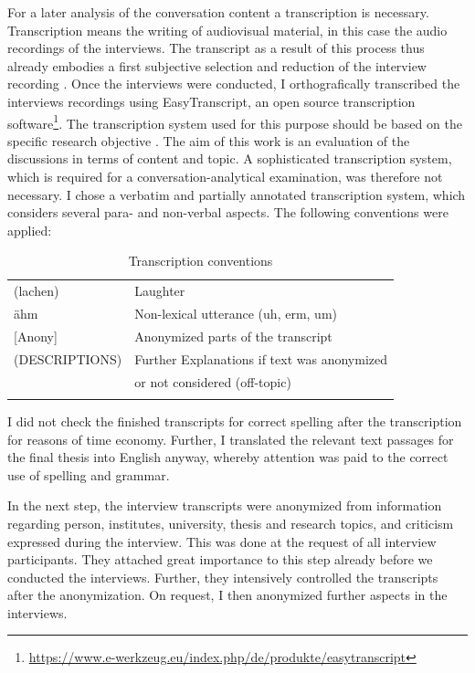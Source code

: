 \documentclass[12pt, a4paper, titlepage, oneside, abstract=true, toc=listof, toc=bibliography, BCOR=1cm]{scrreprt}
\begin{document}
For a later analysis of the conversation content a transcription is necessary. Transcription means the writing of audiovisual material, in this case the audio recordings of the interviews. The transcript as a result of this process thus already embodies a first subjective selection and reduction of the interview recording \citep[p. 321]{Edwards2003}. Once the interviews were conducted, I orthografically transcribed the interviews recordings using EasyTranscript, an open source transcription software\footnote{\url{https://www.e-werkzeug.eu/index.php/de/produkte/easytranscript}}. The transcription system used for this purpose should be based on the specific research objective \citep[p. 331]{Edwards2003}. The aim of this work is an evaluation of the discussions in terms of content and topic. A sophisticated transcription system, which is required for a conversation-analytical examination, was therefore not necessary. I chose a verbatim and partially annotated transcription system, which considers several para- and non-verbal aspects. The following conventions were applied:

\small
\begin{table}
\caption{Transcription conventions}
\centering
\begin{tabular}{ll}
 & \\
\hline
\hline
 	(lachen) & Laughter\\
 	ähm	& Non-lexical utterance (uh, erm, um)\\
 	{[Anony]} & Anonymized parts of the transcript\\
	(DESCRIPTIONS)	& Further Explanations if text was anonymized\\
	               & or not considered (off-topic)\\
\hline
 & \\
\end{tabular}
\end{table}
\normalsize

I did not check the finished transcripts for correct spelling after the transcription for reasons of time economy. Further, I translated the relevant text passages for the final thesis into English anyway, whereby attention was paid to the correct use of spelling and grammar.

In the next step, the interview transcripts were anonymized from information regarding person, institutes, university, thesis and research topics, and criticism expressed during the interview. This was done at the request of all interview participants. They attached great importance to this step already before we conducted the interviews. Further, they intensively controlled the transcripts after the anonymization. On request, I then anonymized further aspects in the interviews.
\end{document}
